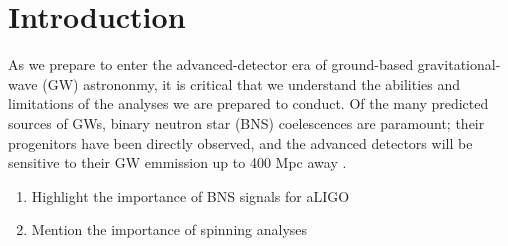 \section{Introduction}

As we prepare to enter the advanced-detector era of ground-based gravitational-wave (GW) astrononmy, it is critical that we understand the abilities and limitations of the analyses we are prepared to conduct.  Of the many predicted sources of GWs, binary neutron star (BNS) coelescences are paramount; their progenitors have been directly observed, and the advanced detectors will be sensitive to their GW emmission up to 400 Mpc away \cite{2013arXiv1304.0670L}.

\begin{enumerate}
\item Highlight the importance of BNS signals for aLIGO
\item Mention the importance of spinning analyses
\end{enumerate}